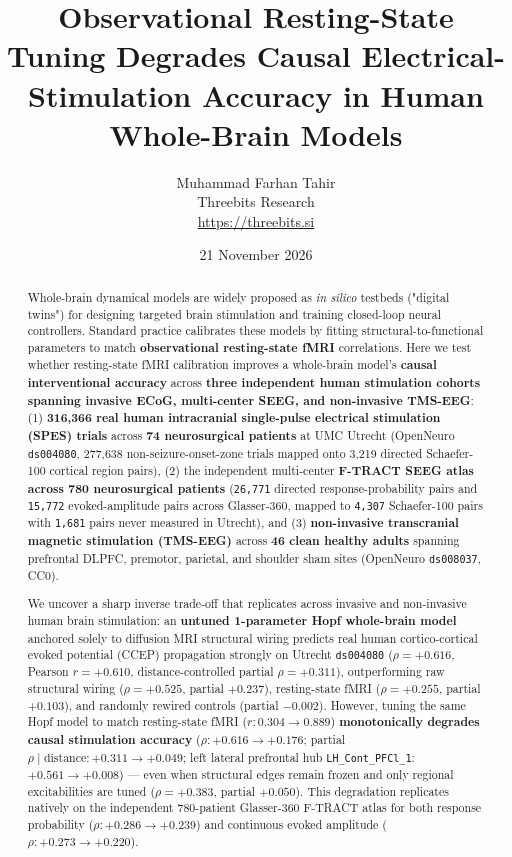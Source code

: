 \documentclass[11pt,a4paper]{article}
\title{Observational Resting-State Tuning Degrades Causal Electrical-Stimulation Accuracy in Human Whole-Brain Models}
\author{Muhammad Farhan Tahir\\Threebits Research\\\url{https://threebits.si}}
\date{21 November 2026}
\begin{document}
\maketitle

\begin{abstract}
Whole-brain dynamical models are widely proposed as \emph{in silico} testbeds ("digital twins") for designing targeted brain stimulation and training closed-loop neural controllers. Standard practice calibrates these models by fitting structural-to-functional parameters to match \textbf{observational resting-state fMRI} correlations. Here we test whether resting-state fMRI calibration improves a whole-brain model's \textbf{causal interventional accuracy} across \textbf{three independent human stimulation cohorts spanning invasive ECoG, multi-center SEEG, and non-invasive TMS-EEG}: (1) \textbf{316,366 real human intracranial single-pulse electrical stimulation (SPES) trials} across \textbf{74 neurosurgical patients} at UMC Utrecht (OpenNeuro \texttt{ds004080}, 277,638 non-seizure-onset-zone trials mapped onto 3,219 directed Schaefer-100 cortical region pairs), (2) the independent multi-center \textbf{F-TRACT SEEG atlas across 780 neurosurgical patients} (\texttt{26,771} directed response-probability pairs and \texttt{15,772} evoked-amplitude pairs across Glasser-360, mapped to \texttt{4,307} Schaefer-100 pairs with \texttt{1,681} pairs never measured in Utrecht), and (3) \textbf{non-invasive transcranial magnetic stimulation (TMS-EEG)} across \textbf{46 clean healthy adults} spanning prefrontal DLPFC, premotor, parietal, and shoulder sham sites (OpenNeuro \texttt{ds008037}, CC0).

We uncover a sharp inverse trade-off that replicates across invasive and non-invasive human brain stimulation: an \textbf{untuned 1-parameter Hopf whole-brain model} anchored solely to diffusion MRI structural wiring predicts real human cortico-cortical evoked potential (CCEP) propagation strongly on Utrecht \texttt{ds004080} ($\rho = +0.616$, Pearson $r = +0.610$, distance-controlled partial $\rho = +0.311$), outperforming raw structural wiring ($\rho = +0.525$, partial $+0.237$), resting-state fMRI ($\rho = +0.255$, partial $+0.103$), and randomly rewired controls (partial $-0.002$). However, tuning the same Hopf model to match resting-state fMRI ($r: 0.304 \to 0.889$) \textbf{monotonically degrades causal stimulation accuracy} ($\rho: +0.616 \to +0.176$; partial $\rho \mid \text{distance}: +0.311 \to +0.049$; left lateral prefrontal hub \texttt{LH\_Cont\_PFCl\_1}: $+0.561 \to +0.008$) --- even when structural edges remain frozen and only regional excitabilities are tuned ($\rho = +0.383$, partial $+0.050$). This degradation replicates natively on the independent 780-patient Glasser-360 F-TRACT atlas for both response probability ($\rho: +0.286 \to +0.239$) and continuous evoked amplitude ($\rho: +0.273 \to +0.220$).


\end{abstract}
\end{document}
